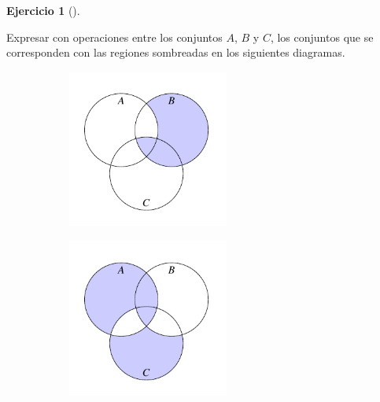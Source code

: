 \documentclass[
  a4paper,
]{scrreport}
\theoremstyle{definition}
\newtheorem{exercise}{Ejercicio}[chapter]
\theoremstyle{remark}
\begin{document}
\begin{exercise}[]\protect\hypertarget{exr-expresion-conjuntos}{}\label{exr-expresion-conjuntos}

Expresar con operaciones entre los conjuntos \(A\), \(B\) y \(C\), los
conjuntos que se corresponden con las regiones sombreadas en los
siguientes diagramas.

\begin{figure}

\begin{minipage}{0.33\linewidth}

\begin{figure}[H]

{\centering \includegraphics[width=2.08333in,height=\textheight]{./img/teoria-conjuntos/conjunto2.pdf}

}


\end{figure}%

\end{minipage}%
%
\begin{minipage}{0.33\linewidth}

\begin{figure}[H]

{\centering \includegraphics[width=2.08333in,height=\textheight]{./img/teoria-conjuntos/conjunto1.pdf}

}


\end{figure}%


\end{minipage}
\end{figure}
\end{exercise}
\end{document}
